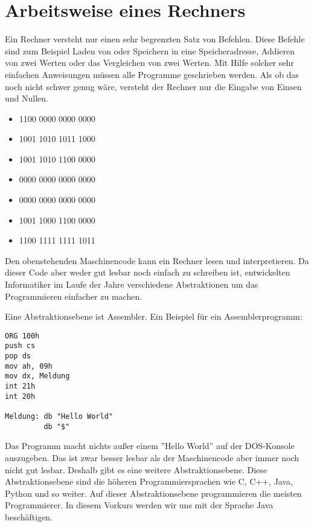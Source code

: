 \section{Arbeitsweise eines Rechners}

Ein Rechner versteht nur einen sehr begrenzten Satz von Befehlen. Diese Befehle sind zum Beispiel Laden von oder Speichern in eine Speicheradresse, Addieren von zwei Werten oder das Vergleichen von zwei Werten. Mit Hilfe solcher sehr einfachen Anweisungen müssen alle Programme geschrieben werden. Als ob das noch nicht schwer genug wäre, versteht der Rechner nur die Eingabe von Einsen und Nullen. 

\begin{itemize}
	\item[]1100 0000 0000 0000
	\item[]1001 1010 1011 1000
	\item[]1001 1010 1100 0000
	\item[]0000 0000 0000 0000
	\item[]0000 0000 0000 0000
	\item[]1001 1000 1100 0000
	\item[]1100 1111 1111 1011
\end{itemize}

Den obenstehenden Maschinencode kann ein Rechner lesen und interpretieren. Da dieser Code aber weder gut lesbar noch einfach zu schreiben ist, entwickelten Informatiker im Laufe der Jahre verschiedene Abstraktionen um das Programmieren einfacher zu machen.

Eine Abstraktionsebene ist Assembler. Ein Beispiel für ein Assemblerprogramm:

\begin{minipage}{\textwidth}
\begin{lstlisting}
ORG 100h 
push cs
pop ds 
mov ah, 09h
mov dx, Meldung 
int 21h
int 20h
 
Meldung: db "Hello World"
         db "$" 
\end{lstlisting}
\end{minipage}

Das Programm macht nichts außer einem ''Hello World'' auf der DOS-Konsole auszugeben. Das ist zwar besser lesbar als der Maschinencode aber immer noch nicht gut lesbar. Deshalb gibt es eine weitere Abstraktionsebene. Diese Abstraktionsebene sind die höheren Programmiersprachen wie C, C++, Java, Python und so weiter. Auf dieser Abstraktionsebene programmieren die meisten Programmierer. In diesem Vorkurs werden wir uns mit der Sprache Java beschäftigen.